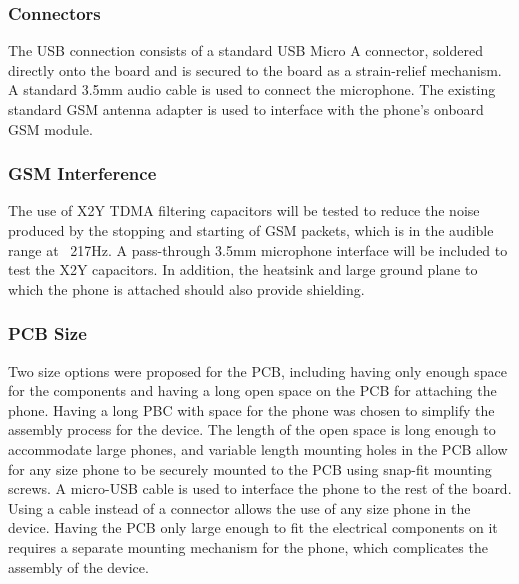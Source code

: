 \documentclass{article}
\numberwithin{figure}{section}
\numberwithin{equation}{section}
\begin{document}
{\subsubsection{Connectors}

The USB connection consists of a standard USB Micro A connector, soldered directly onto the board and is secured to the board as a strain-relief mechanism. A standard 3.5mm audio cable is used to connect the microphone. The existing standard GSM antenna adapter is used to interface with the phone’s onboard GSM module.


\subsubsection{GSM Interference}

The use of X2Y TDMA filtering capacitors will be tested to reduce the noise produced by the stopping and starting of GSM packets, which is in the audible range at ~217Hz. A pass-through 3.5mm microphone interface will be included to test the X2Y capacitors. In addition, the heatsink and large ground plane to which the phone is attached should also provide shielding.

\subsubsection{PCB Size}
Two size options were proposed for the PCB, including having only enough space for the components and having a long open space on the PCB for attaching the phone. Having a long PBC with space for the phone was chosen to simplify the assembly process for the device. The length of the open space is long enough to accommodate large phones, and variable length mounting holes in the PCB allow for any size phone to be securely mounted to the PCB using snap-fit mounting screws. A micro-USB cable is used to interface the phone to the rest of the board. Using a cable instead of a connector allows the use of any size phone in the device. Having the PCB only large enough to fit the electrical components on it requires a separate mounting mechanism for the phone, which complicates the assembly of the device.

}
\end{document}
